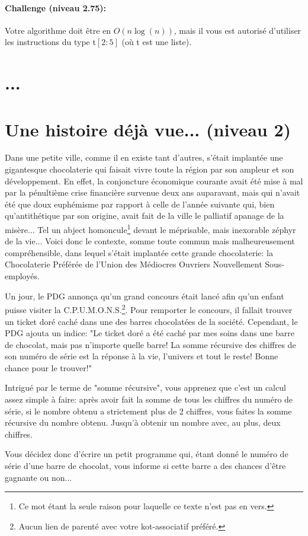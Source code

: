 \documentclass[a4paper]{article}
\begin{document}
\paragraph{Challenge (niveau 2.75): }
Votre algorithme doit être en $O(n \log (n))$, mais il vous est autorisé d'utiliser les instructions du type t$[2:5]$ (où t est une liste).


\section{...}


\section{Une histoire déjà vue... (niveau 2)}

Dans une petite ville, comme il en existe tant d'autres, s'était implantée une gigantesque chocolaterie qui faisait vivre toute la région par son ampleur et son développement. En effet, la conjoncture économique courante avait été mise à mal par la pénultième crise financière survenue deux ans auparavant, mais qui n'avait été que doux euphémisme par rapport à celle de l'année suivante qui, bien qu'antithétique par son origine, avait fait de la ville le palliatif apanage de la misère... Tel un abject homoncule\footnote{Ce mot étant la seule raison pour laquelle ce texte n'est pas en vers.} devant le méprisable, mais inexorable zéphyr de la vie... Voici donc le contexte, somme toute commun mais malheureusement compréhensible, dans lequel s'était implantée cette grande chocolaterie: la Chocolaterie Préférée de l'Union des Médiocres Ouvriers Nouvellement Sous-employés.\\
\par Un jour, le PDG annonça qu'un grand concours était lancé afin qu'un enfant puisse visiter la C.P.U.M.O.N.S.\footnote{Aucun lien de parenté avec votre kot-associatif préféré.}. Pour remporter le concours, il fallait trouver un ticket doré caché dans une des barres chocolatées de la société. Cependant, le PDG ajouta un indice: "Le ticket doré a été caché par mes soins dans une barre de chocolat, mais pas n'importe quelle barre! La somme récursive des chiffres de son numéro de série est la réponse à la vie, l'univers et tout le reste! Bonne chance pour le trouver!"
\par Intrigué par le terme de "somme récursive", vous apprenez que c'est un calcul assez simple à faire: après avoir fait la somme de tous les chiffres du numéro de série, si le nombre obtenu a strictement plus de 2 chiffres, vous faites la somme récursive du nombre obtenu. Jusqu'à obtenir un nombre avec, au plus, deux chiffres.
\par Vous décidez donc d'écrire un petit programme qui, étant donné le numéro de série d'une barre de chocolat, vous informe si cette barre a des chances d'être gagnante ou non...
\end{document}
